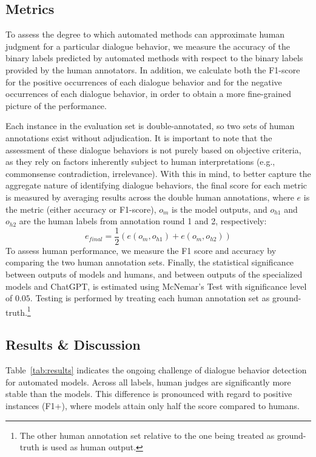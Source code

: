 \subsection{Metrics}

To assess the degree to which automated methods can approximate human judgment for a particular dialogue behavior, we measure the accuracy of the binary labels predicted by automated methods with respect to the binary labels provided by the human annotators. In addition, we calculate both the F1-score for the positive occurrences of each dialogue behavior and for the negative occurrences of each dialogue behavior, in order to obtain a more fine-grained picture of the performance.

Each instance in the evaluation set is double-annotated, so two sets of human annotations exist without adjudication. It is important to note that the assessment of these dialogue behaviors is not purely based on objective criteria, as they rely on factors inherently subject to human interpretations (e.g., commonsense contradiction, irrelevance). With this in mind, to better capture the aggregate nature of identifying dialogue behaviors, the final score for each metric is measured by averaging results across the double human annotations, where $e$ is the metric (either accuracy or F1-score), $o_m$ is the model outputs, and $o_{h1}$ and $o_{h2}$ are the human labels from annotation round 1 and 2, respectively: $$ e_{final} = \frac{1}{2}(e(o_m, o_{h1}) + e(o_m, o_{h2})) $$ To assess human performance, we measure the F1 score and accuracy by comparing the two human annotation sets. Finally, the statistical significance between outputs of models and humans, and between outputs of the specialized models and ChatGPT, is estimated using McNemar's Test with significance level of $0.05$. Testing is performed by treating each human annotation set as ground-truth.\footnote{The other human annotation set relative to the one being treated as ground-truth is used as human output.}

\subsection{Results \& Discussion}
\label{sec:results}

 Table~\ref{tab:results} indicates the ongoing challenge of dialogue behavior detection for automated models. Across all labels, human judges are significantly more stable than the models. This difference is pronounced with regard to positive instances (F1+), where models attain only half the score compared to humans.

